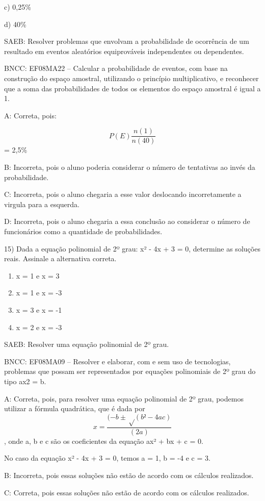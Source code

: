 c) 0,25\%

d) 40\%

SAEB: Resolver problemas que envolvam a probabilidade de ocorrência de
um resultado em eventos aleatórios equiprováveis independentes ou
dependentes.

BNCC: EF08MA22 -- Calcular a probabilidade de eventos, com base na
construção do espaço amostral, utilizando o princípio multiplicativo, e
reconhecer que a soma das probabilidades de todos os elementos do espaço
amostral é igual a 1.

A: Correta, pois:

\[P(E)\frac{n(1)}{n(40)}\]= 2,5\%

B: Incorreta, pois o aluno poderia considerar o número de tentativas ao
invés da probabilidade.

C: Incorreta, pois o aluno chegaria a esse valor deslocando
incorretamente a virgula para a esquerda.

D: Incorreta, pois o aluno chegaria a essa conclusão ao considerar o
número de funcionários como a quantidade de probabilidades.

15) Dada a equação polinomial de 2º grau: x² - 4x + 3 = 0, determine as
soluções reais. Assinale a alternativa correta.

\begin{enumerate}
\def\labelenumi{\alph{enumi})}
\item
  x = 1 e x = 3
\item
  x = 1 e x = -3
\item
  x = 3 e x = -1
\item
  x = 2 e x = -3
\end{enumerate}

SAEB: Resolver uma equação polinomial de 2º grau.

BNCC: EF08MA09 -- Resolver e elaborar, com e sem uso de tecnologias,
problemas que possam ser representados por equações polinomiais de 2º
grau do tipo ax2 = b.

A: Correta, pois, para resolver uma equação polinomial de 2º grau,
podemos utilizar a fórmula quadrática, que é dada por
\[x = \frac {(-b ± √(b² - 4ac)} {(2a)}\], onde a, b e c são os
coeficientes da equação ax² + bx + c = 0.

No caso da equação x² - 4x + 3 = 0, temos a = 1, b = -4 e c = 3.

B: Incorreta, pois essas soluções não estão de acordo com os cálculos
realizados.

C: Correta, pois essas soluções não estão de acordo com os cálculos
realizados.

